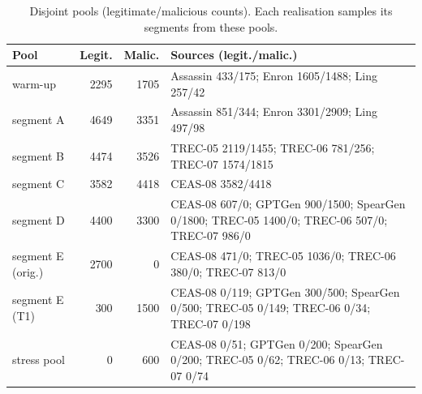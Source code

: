 \begin{table}[t]
\centering
\caption{Disjoint pools (legitimate/malicious counts). Each realisation samples its segments from these pools.}
\label{tab:pools}
\scriptsize
\setlength{\tabcolsep}{2.5pt}
\begin{tabular}{@{}lrr>{\raggedright\arraybackslash}p{9cm}@{}}
\toprule
Pool & Legit. & Malic. & Sources (legit./malic.) \\
\midrule
warm-up & 2295 & 1705 & Assassin 433/175; Enron 1605/1488; Ling 257/42 \\
segment A & 4649 & 3351 & Assassin 851/344; Enron 3301/2909; Ling 497/98 \\
segment B & 4474 & 3526 & TREC-05 2119/1455; TREC-06 781/256; TREC-07 1574/1815 \\
segment C & 3582 & 4418 & CEAS-08 3582/4418 \\
segment D & 4400 & 3300 & CEAS-08 607/0; GPTGen 900/1500; SpearGen 0/1800; TREC-05 1400/0; TREC-06 507/0; TREC-07 986/0 \\
segment E (orig.) & 2700 & 0 & CEAS-08 471/0; TREC-05 1036/0; TREC-06 380/0; TREC-07 813/0 \\
segment E (T1) & 300 & 1500 & CEAS-08 0/119; GPTGen 300/500; SpearGen 0/500; TREC-05 0/149; TREC-06 0/34; TREC-07 0/198 \\
stress pool & 0 & 600 & CEAS-08 0/51; GPTGen 0/200; SpearGen 0/200; TREC-05 0/62; TREC-06 0/13; TREC-07 0/74 \\
\bottomrule
\end{tabular}
\end{table}
